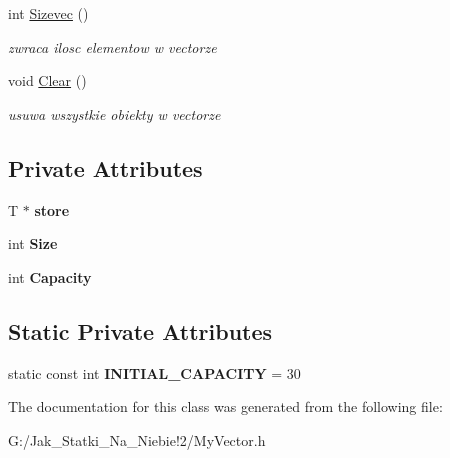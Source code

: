 \begin{DoxyCompactItemize}
int \hyperlink{class_my_vector_a626cb4a9b2bae47d8752a3b82c413a4d}{Sizevec} ()
\begin{DoxyCompactList}\small\item\em zwraca ilosc elementow w vectorze \end{DoxyCompactList}\item 
\mbox{\label{class_my_vector_adc155c04c9e259a034f268788b39babd}} 
void \hyperlink{class_my_vector_adc155c04c9e259a034f268788b39babd}{Clear} ()
\begin{DoxyCompactList}\small\item\em usuwa wszystkie obiekty w vectorze \end{DoxyCompactList}\end{DoxyCompactItemize}
\subsection*{Private Attributes}
\begin{DoxyCompactItemize}
\item 
\mbox{\label{class_my_vector_a8f893cb6e773054d114ae48825cd2483}} 
T $\ast$ {\bfseries store}
\item 
\mbox{\label{class_my_vector_a2e061591737e8c3c63bbdd0dd0f010e1}} 
int {\bfseries Size}
\item 
\mbox{\label{class_my_vector_aa588fb07adc0fa7c188327959c38b8d4}} 
int {\bfseries Capacity}
\end{DoxyCompactItemize}
\subsection*{Static Private Attributes}
\begin{DoxyCompactItemize}
\item 
\mbox{\label{class_my_vector_ae460019a68266e8e8a1085f19c6dc1d2}} 
static const int {\bfseries I\+N\+I\+T\+I\+A\+L\+\_\+\+C\+A\+P\+A\+C\+I\+TY} = 30
\end{DoxyCompactItemize}


The documentation for this class was generated from the following file\+:\begin{DoxyCompactItemize}
\item 
G\+:/\+Jak\+\_\+\+Statki\+\_\+\+Na\+\_\+\+Niebie!2/My\+Vector.\+h\end{DoxyCompactItemize}
